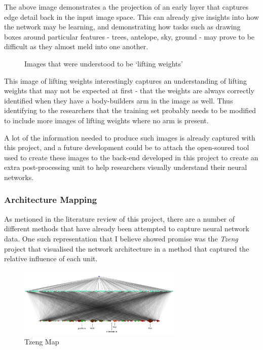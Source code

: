 \documentclass[a4paper,11pt,titlepage]{article}
\begin{document}
	The above image demonstrates a the projection of an early layer that captures edge detail back in the input image space. This can already give insights into how the network may be learning, and demonstrating how tasks such as drawing boxes around particular features - trees, antelope, sky, ground - may prove to be difficult as they almost meld into one another.
	
		\begin{figure}[H]
    			\caption{Images that were understood to be `lifting weights'}%
	\end{figure}	
	
	This image of lifting weights interestingly captures an understanding of lifting weights that may not be expected at first - that the weights are always correctly identified when they have a body-builders arm in the image as well. Thus identifying to the researchers that the training set probably needs to be modified to include more images of lifting weights where no arm is present.
	\par 
	A lot of the information needed to produce such images is already captured with this project, and a future development could be to attach the open-soured tool used to create these images to the back-end developed in this project to create an extra post-processing unit to help researchers visually understand their neural networks.
	
	\subsubsection{Architecture Mapping}
	
	As metioned in the literature review of this project, there are a number of different methods that have already been attempted to capture neural network data. One such representation that I believe showed promise was the \textit{Tzeng} project that visualised the network architecture in a method that captured the relative influence of each unit.
	
	\begin{figure}[H]
		\centering 
    		\includegraphics[width=0.7\textwidth]{img/tzeng_large_map.png} 
    		\caption{Tzeng Map}%
 	\end{figure}
 	
\end{document}
